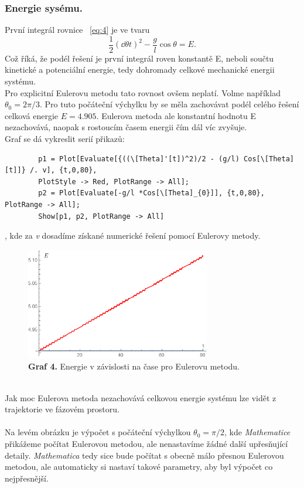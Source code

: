 \documentclass[reqno, a4paper]{amsart}
\begin{document}
		\subsubsection{Energie sysému.} První integrál rovnice ~\eqref{eq:4} je ve tvaru
		\begin{equation}
			\frac{1}{2}
			\left(
			\dd{\theta}{t}
			\right)^2
			-
			\frac{g}{l}
			\cos \theta
			=
			E
			.
		\end{equation}
		Což říká, že podél řešení je první integrál roven konstantě E, neboli součtu kinetické a potenciální energie, tedy dohromady celkové mechanické energii systému.
		\\
		Pro explicitní Eulerovu metodu tato rovnost ovšem neplatí. Volme například $\theta_{0} =2\pi/3$. Pro tuto počáteční výchylku by se měla zachovávat podél celého řešení celková energie $E=4.905$. Eulerova metoda ale konstantní hodnotu E nezachovává, naopak s rostoucím časem energii čím dál víc zvyšuje.
		\\
		Graf se dá vykreslit serií přikazů:
		\begin{verbatim}
		p1 = Plot[Evaluate[{((\[Theta]'[t])^2)/2 - (g/l) Cos[\[Theta][t]]} /. v], {t,0,80}, 
		PlotStyle -> Red, PlotRange -> All];
		p2 = Plot[Evaluate[-g/l *Cos[\[Theta]_{0}]], {t,0,80}, PlotRange -> All];
		Show[p1, p2, PlotRange -> All]
		\end{verbatim}
	, kde za \textit{v} dosadíme získané numerické řešení pomocí Eulerovy metody.
		\begin{figure}[h]
			\centering
			\includegraphics[width=0.72\textwidth]{energie}
			\caption*{\textbf{Graf 4.} Energie v závislosti na čase pro Eulerovu metodu.}  
		\end{figure}
		\\
		Jak moc Eulerova metoda nezachovává celkovou energie systému lze vidět z trajektorie ve fázovém prostoru.\
		\\
		\\
		Na levém obrázku je výpočet s počáteční výchylkou $\theta_{0}=\pi/2$, kde \textit{Mathematice} přikážeme počítat Eulerovou metodou, ale nenastavíme žádné další upřesňující detaily. \textit{Mathematica} tedy sice bude počítat s obecně málo přesnou Eulerovou metodou, ale automaticky si nastaví takové parametry, aby byl výpočet co nejpřesnější.
\end{document}
